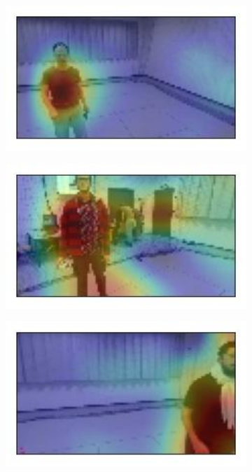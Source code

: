 \begin{figure}[!h]
	\begin{center}
		\begin{subfigure}[h]{0.24\textwidth}
			\centering
			\includegraphics[width=1\textwidth]{"contents/images/gradcam/gradcam-ok-1"}
		\end{subfigure}
		\hfill
		\begin{subfigure}[h]{0.24\textwidth}
			\centering
			\includegraphics[width=1\textwidth]{"contents/images/gradcam/gradcam-ok-2"}
		\end{subfigure}
		\hfill
		\begin{subfigure}[h]{0.24\textwidth}
			\centering
			\includegraphics[width=1\textwidth]{"contents/images/gradcam/gradcam-ok-3"}

\end{subfigure}
\end{center}
\end{figure}
